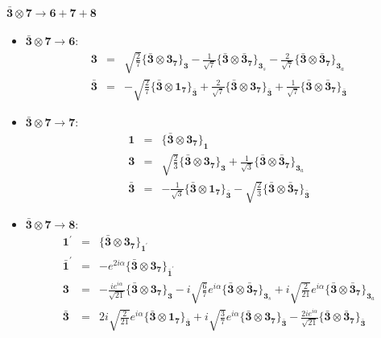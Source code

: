 \documentclass[english]{article}
\newcommand{\subcg}[3]{\big\{ {#1}\otimes{#2}\big\}^{}_{#3}}
\newcommand{\rep}[1]{\mathbf{#1}}
\begin{document}
\paragraph*{\Large $\rep{\bar{3}}\otimes\rep{7}\to\rep{6}+\rep{7}+\rep{8}$}
\begin{itemize}
\item $\rep{\bar{3}}\otimes\rep{7}\to\rep{6}$:
\begin{eqnarray*}
\rep{3} &=& \sqrt{\frac{2}{7}}\subcg{\rep{\bar{3}}}{\rep{3}_{\rep{7}}}{\rep{3}}-\frac{1}{\sqrt{7}}\subcg{\rep{\bar{3}}}{\rep{\bar{3}}_{\rep{7}}}{\rep{3}_{s}}-\frac{2}{\sqrt{7}}\subcg{\rep{\bar{3}}}{\rep{\bar{3}}_{\rep{7}}}{\rep{3}_{a}}
\\
\rep{\bar{3}} &=& -\sqrt{\frac{2}{7}}\subcg{\rep{\bar{3}}}{\rep{1}_{\rep{7}}}{\rep{\bar{3}}}+\frac{2}{\sqrt{7}}\subcg{\rep{\bar{3}}}{\rep{3}_{\rep{7}}}{\rep{\bar{3}}}+\frac{1}{\sqrt{7}}\subcg{\rep{\bar{3}}}{\rep{\bar{3}}_{\rep{7}}}{\rep{\bar{3}}}
\end{eqnarray*}
\item $\rep{\bar{3}}\otimes\rep{7}\to\rep{7}$:
\begin{eqnarray*}
\rep{1} &=& \subcg{\rep{\bar{3}}}{\rep{3}_{\rep{7}}}{\rep{1}}
\\
\rep{3} &=& \sqrt{\frac{2}{3}}\subcg{\rep{\bar{3}}}{\rep{3}_{\rep{7}}}{\rep{3}}+\frac{1}{\sqrt{3}}\subcg{\rep{\bar{3}}}{\rep{\bar{3}}_{\rep{7}}}{\rep{3}_{a}}
\\
\rep{\bar{3}} &=& -\frac{1}{\sqrt{3}}\subcg{\rep{\bar{3}}}{\rep{1}_{\rep{7}}}{\rep{\bar{3}}}-\sqrt{\frac{2}{3}}\subcg{\rep{\bar{3}}}{\rep{\bar{3}}_{\rep{7}}}{\rep{\bar{3}}}
\end{eqnarray*}
\item $\rep{\bar{3}}\otimes\rep{7}\to\rep{8}$:
\begin{eqnarray*}
\rep{1^{\prime}} &=& \subcg{\rep{\bar{3}}}{\rep{3}_{\rep{7}}}{\rep{1^{\prime}}}
\\
\rep{\bar{1}^{\prime}} &=& -e^{2 i \alpha }\subcg{\rep{\bar{3}}}{\rep{3}_{\rep{7}}}{\rep{\bar{1}^{\prime}}}
\\
\rep{3} &=& -\frac{i e^{i \alpha }}{\sqrt{21}}\subcg{\rep{\bar{3}}}{\rep{3}_{\rep{7}}}{\rep{3}}-i \sqrt{\frac{6}{7}} e^{i \alpha }\subcg{\rep{\bar{3}}}{\rep{\bar{3}}_{\rep{7}}}{\rep{3}_{s}}+i \sqrt{\frac{2}{21}} e^{i \alpha }\subcg{\rep{\bar{3}}}{\rep{\bar{3}}_{\rep{7}}}{\rep{3}_{a}}
\\
\rep{\bar{3}} &=& 2 i \sqrt{\frac{2}{21}} e^{i \alpha }\subcg{\rep{\bar{3}}}{\rep{1}_{\rep{7}}}{\rep{\bar{3}}}+i \sqrt{\frac{3}{7}} e^{i \alpha }\subcg{\rep{\bar{3}}}{\rep{3}_{\rep{7}}}{\rep{\bar{3}}}-\frac{2 i e^{i \alpha }}{\sqrt{21}}\subcg{\rep{\bar{3}}}{\rep{\bar{3}}_{\rep{7}}}{\rep{\bar{3}}}
\end{eqnarray*}
\end{itemize}
\end{document}
